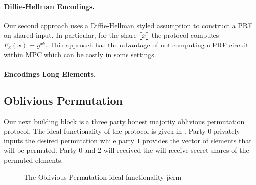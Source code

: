 \paragraph{Diffie-Hellman Encodings.} Our second approach uses a Diffie-Hellman styled assumption to construct a PRF on shared input. In particular, for the share $\llbracket x\rrbracket$ the protocol computes $F_k(x) = g^{xk}$. This approach has the advantage of not computing a PRF circuit within MPC which can be costly in some settings.




\paragraph{Encodings Long Elements.}


\subsection{Oblivious Permutation}

Our next building block is a three party honest majority oblivious permutation protocol. The ideal functionality of the protocol is given in . Party 0 privately inputs the desired permutation while party 1 provides the vector of elements that will be permuted. Party 0 and 2 will received the will receive secret shares of the permuted elements.


\begin{figure}[ht]
	\caption{The Oblivious Permutation ideal functionality \f{perm}}
	\label{fig:perm-ideal}	
\end{figure}

